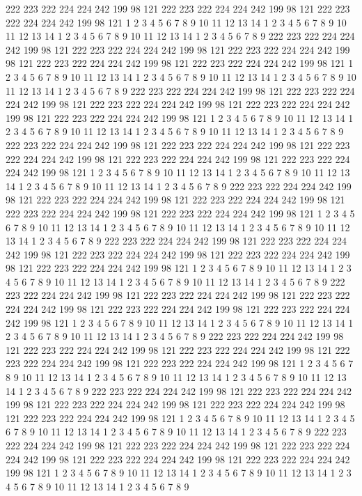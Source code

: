 222 223 222 224 224 242 199 98 121
222 223 222 224 224 242 199 98 121
222 223 222 224 224 242 199 98 121
1 2 3 4 5 6 7 8 9
10 11 12 13 14
1 2 3 4 5 6 7 8 9
10 11 12 13 14
1 2 3 4 5 6 7 8 9
10 11 12 13 14
1 2 3 4 5 6 7 8 9
222 223 222 224 224 242 199 98 121
222 223 222 224 224 242 199 98 121
222 223 222 224 224 242 199 98 121
222 223 222 224 224 242 199 98 121
222 223 222 224 224 242 199 98 121
1 2 3 4 5 6 7 8 9
10 11 12 13 14
1 2 3 4 5 6 7 8 9
10 11 12 13 14
1 2 3 4 5 6 7 8 9
10 11 12 13 14
1 2 3 4 5 6 7 8 9
222 223 222 224 224 242 199 98 121
222 223 222 224 224 242 199 98 121
222 223 222 224 224 242 199 98 121
222 223 222 224 224 242 199 98 121
222 223 222 224 224 242 199 98 121
1 2 3 4 5 6 7 8 9
10 11 12 13 14
1 2 3 4 5 6 7 8 9
10 11 12 13 14
1 2 3 4 5 6 7 8 9
10 11 12 13 14
1 2 3 4 5 6 7 8 9
222 223 222 224 224 242 199 98 121
222 223 222 224 224 242 199 98 121
222 223 222 224 224 242 199 98 121
222 223 222 224 224 242 199 98 121
222 223 222 224 224 242 199 98 121
1 2 3 4 5 6 7 8 9
10 11 12 13 14
1 2 3 4 5 6 7 8 9
10 11 12 13 14
1 2 3 4 5 6 7 8 9
10 11 12 13 14
1 2 3 4 5 6 7 8 9
222 223 222 224 224 242 199 98 121
222 223 222 224 224 242 199 98 121
222 223 222 224 224 242 199 98 121
222 223 222 224 224 242 199 98 121
222 223 222 224 224 242 199 98 121
1 2 3 4 5 6 7 8 9
10 11 12 13 14
1 2 3 4 5 6 7 8 9
10 11 12 13 14
1 2 3 4 5 6 7 8 9
10 11 12 13 14
1 2 3 4 5 6 7 8 9
222 223 222 224 224 242 199 98 121
222 223 222 224 224 242 199 98 121
222 223 222 224 224 242 199 98 121
222 223 222 224 224 242 199 98 121
222 223 222 224 224 242 199 98 121
1 2 3 4 5 6 7 8 9
10 11 12 13 14
1 2 3 4 5 6 7 8 9
10 11 12 13 14
1 2 3 4 5 6 7 8 9
10 11 12 13 14
1 2 3 4 5 6 7 8 9
222 223 222 224 224 242 199 98 121
222 223 222 224 224 242 199 98 121
222 223 222 224 224 242 199 98 121
222 223 222 224 224 242 199 98 121
222 223 222 224 224 242 199 98 121
1 2 3 4 5 6 7 8 9
10 11 12 13 14
1 2 3 4 5 6 7 8 9
10 11 12 13 14
1 2 3 4 5 6 7 8 9
10 11 12 13 14
1 2 3 4 5 6 7 8 9
222 223 222 224 224 242 199 98 121
222 223 222 224 224 242 199 98 121
222 223 222 224 224 242 199 98 121
222 223 222 224 224 242 199 98 121
222 223 222 224 224 242 199 98 121
1 2 3 4 5 6 7 8 9
10 11 12 13 14
1 2 3 4 5 6 7 8 9
10 11 12 13 14
1 2 3 4 5 6 7 8 9
10 11 12 13 14
1 2 3 4 5 6 7 8 9
222 223 222 224 224 242 199 98 121
222 223 222 224 224 242 199 98 121
222 223 222 224 224 242 199 98 121
222 223 222 224 224 242 199 98 121
222 223 222 224 224 242 199 98 121
1 2 3 4 5 6 7 8 9
10 11 12 13 14
1 2 3 4 5 6 7 8 9
10 11 12 13 14
1 2 3 4 5 6 7 8 9
10 11 12 13 14
1 2 3 4 5 6 7 8 9
222 223 222 224 224 242 199 98 121
222 223 222 224 224 242 199 98 121
222 223 222 224 224 242 199 98 121
222 223 222 224 224 242 199 98 121
222 223 222 224 224 242 199 98 121
1 2 3 4 5 6 7 8 9
10 11 12 13 14
1 2 3 4 5 6 7 8 9
10 11 12 13 14
1 2 3 4 5 6 7 8 9
10 11 12 13 14
1 2 3 4 5 6 7 8 9

